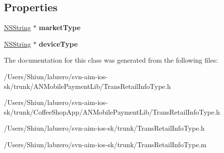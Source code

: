 \subsection*{Properties}
\begin{DoxyCompactItemize}
\item 
\hypertarget{interface_trans_retail_info_type_a76c51a777463878d5941be0fcf7d45d3}{
\hyperlink{class_n_s_string}{NSString} $\ast$ {\bfseries marketType}}
\label{interface_trans_retail_info_type_a76c51a777463878d5941be0fcf7d45d3}

\item 
\hypertarget{interface_trans_retail_info_type_a167ed015ed817f7bd0b387f8ba4cfa4d}{
\hyperlink{class_n_s_string}{NSString} $\ast$ {\bfseries deviceType}}
\label{interface_trans_retail_info_type_a167ed015ed817f7bd0b387f8ba4cfa4d}

\end{DoxyCompactItemize}


The documentation for this class was generated from the following files:\begin{DoxyCompactItemize}
\item 
/Users/Shiun/labzero/svn-\/aim-\/ios-\/sk/trunk/ANMobilePaymentLib/TransRetailInfoType.h\item 
/Users/Shiun/labzero/svn-\/aim-\/ios-\/sk/trunk/CoffeeShopApp/ANMobilePaymentLib/TransRetailInfoType.h\item 
/Users/Shiun/labzero/svn-\/aim-\/ios-\/sk/trunk/TransRetailInfoType.h\item 
/Users/Shiun/labzero/svn-\/aim-\/ios-\/sk/trunk/TransRetailInfoType.m\end{DoxyCompactItemize}
